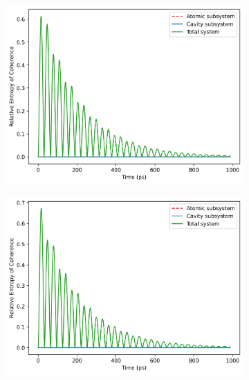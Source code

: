 \documentclass[11pt]{article}
\begin{document}
\begin{figure}[H]
    \centering
    \begin{subfigure}{0.45\textwidth}
        \centering
        \includegraphics[width=\linewidth]{Research Project/Code/results/JCM/OQS_Coh_Spont.png}
        \caption{}
        \label{fig:JCM_OQS_Coh_Spont}
    \end{subfigure}
    \hfill
    \begin{subfigure}{0.45\textwidth}
        \centering
        \includegraphics[width=\linewidth]{Research Project/Code/results/JCM/OQS_Coh_Therm.png}
        \caption{}
        \label{fig:JCM_OQS_Coh_Therm}
    \end{subfigure}
    

\end{figure}
\end{document}

